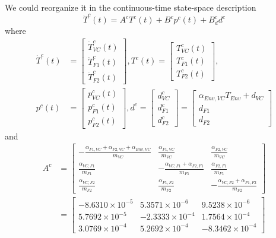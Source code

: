 \documentclass[a4paper,twoside,11pt]{article}
\numberwithin{equation}{section}
\begin{document}
We could reorganize it in the continuous-time state-space description
\begin{equation}
    \dot{T}^c(t) = A^cT^c(t) + B^cp^c(t) + B^c_d d^c
\end{equation}
where 
\begin{equation*}
\begin{split}
    \dot{T}^c(t) &= 
    \begin{bmatrix}
    \dot{T}^c_{VC}(t)\\
    \dot{T}^c_{F1}(t)\\
    \dot{T}^c_{F2}(t)
    \end{bmatrix}
    , 
    T^c(t) = 
    \begin{bmatrix}
    T^c_{VC}(t)\\
    T^c_{F1}(t)\\
    T^c_{F2}(t)
    \end{bmatrix}
    , \\
    p^c(t) &= 
    \begin{bmatrix}
    p^c_{VC}(t)\\
    p^c_{F1}(t)\\
    p^c_{F2}(t)
    \end{bmatrix}
    , 
    d^c = 
    \begin{bmatrix}
    d^c_{VC}\\
    d^c_{F1}\\
    d^c_{F2}
    \end{bmatrix}
    =
    \begin{bmatrix}
    \alpha_{Env,VC}T_{Env} + d_{VC}\\
    d_{F1}\\
    d_{F2}
    \end{bmatrix}
\end{split}
\end{equation*}
and
\begin{equation*}
\begin{split}
    A^c &= 
    \begin{bmatrix}
    -\frac{\alpha_{F1,VC}+\alpha_{F2,VC}+\alpha_{Env,VC}}{m_{VC}} & \frac{\alpha_{F1,VC}}{m_{VC}} & \frac{\alpha_{F2,VC}}{m_{VC}} \\
    \frac{\alpha_{VC,F1}}{m_{F1}} & -\frac{\alpha_{VC,F1}+\alpha_{F2,F1}}{m_{F1}} & \frac{\alpha_{F2,F1}}{m_{F1}} \\
    \frac{\alpha_{VC,F2}}{m_{F2}} & \frac{\alpha_{F1,F2}}{m_{F2}} & -\frac{\alpha_{VC,F2}+\alpha_{F1,F2}}{m_{F2}}
    \end{bmatrix} \\
    &=
    \begin{bmatrix}
    -8.6310\times10^{-5} & 5.3571\times10^{-6} & 9.5238\times10^{-6}\\
    5.7692\times10^{-5} & -2.3333\times10^{-4} & 1.7564\times10^{-4}\\
    3.0769\times10^{-4} & 5.2692\times10^{-4} & -8.3462\times10^{-4}
    \end{bmatrix}
\end{split}
\end{equation*}
\end{document}
